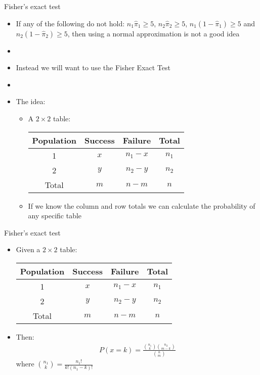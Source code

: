 \documentclass[xcolor=dvipsnames]{beamer}
\begin{document}
\begin{frame}{Fisher's exact test}
	\begin{itemize}
		\item If any of the following do not hold: $n_1 \hat{\pi}_1 \geq 5$, $n_2 \hat{\pi}_2 \geq 5$, $n_1 (1-\hat{\pi}_1) \geq 5$ and $n_2 (1-\hat{\pi}_2) \geq 5$, then using a normal approximation is not a good idea  \pause
		\item[]
		\item Instead we will want to use the Fisher Exact Test  \pause
		\item[]
		\item The idea:  \pause
		\begin{itemize}
			\item A $2\times 2$ table:
			\begin{center}
				\begin{tabular}{c|cc|c}
					\hline
					\textbf{Population} & \textbf{Success} & \textbf{Failure} & \textbf{Total} \\ \hline \hline
					1 & $x$ &$n_1 -x$ & $n_1$\\
					2 & $y$ &$n_2-y$ & $n_2$ \\ \hline \hline
					Total & $m$ & $n-m$ & $n$ \\ \hline
				\end{tabular}
			\vspace{5mm}
			\end{center}  \pause
			\item If we know the column and row totals we can calculate the probability of any specific table
		\end{itemize}
	\end{itemize}
\end{frame}

\begin{frame}{Fisher's exact test}
	\begin{itemize}
		\item Given a $2\times 2$ table:
		\begin{center}
			\begin{tabular}{c|cc|c}
				\hline
				\textbf{Population} & \textbf{Success} & \textbf{Failure} & \textbf{Total} \\ \hline \hline
				1 & $x$ &$n_1 -x$ & $n_1$\\
				2 & $y$ &$n_2-y$ & $n_2$ \\ \hline \hline
				Total & $m$ & $n-m$ & $n$ \\ \hline
			\end{tabular}
			\vspace{5mm}
		\end{center}
		\item Then: 
		\begin{gather*}
			P(x = k) = \frac{\binom{n_1}{k} \binom{n_2}{m-k}}{\binom{n}{m}}
		\end{gather*}  \pause
		where $\binom{n_1}{k} = \frac{n_1!}{k!(n_1-k)!}$
	\end{itemize} 
\end{frame}
\end{document}

